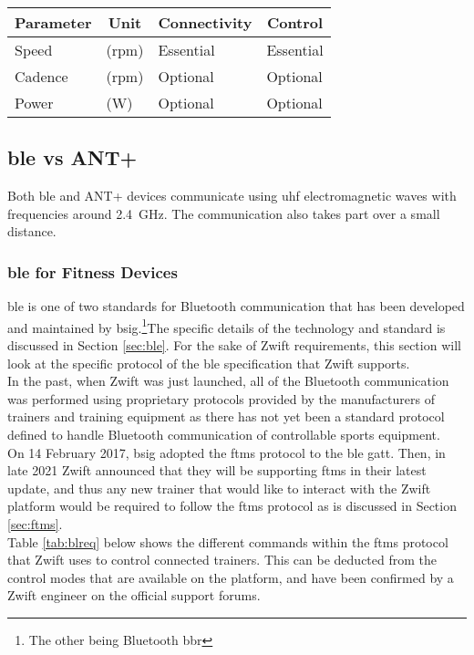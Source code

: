 \begin{table}[h!]
	\renewcommand{\arraystretch}{1.5}
	\centering
	\begin{tabularx}{\textwidth}{ p{2cm} X X X}
		\toprule
		\multicolumn{1}{c}{Parameter} & \multicolumn{1}{c}{Unit} & \multicolumn{1}{c}{Connectivity} & \multicolumn{1}{c}{Control} \\
		\midrule
		Speed                         & (\acs{rpm})              & Essential                        & Essential                   \\
		Cadence                       & (\acs{rpm})              & Optional                         & Optional                    \\
		Power                         & (\si{\watt})             & Optional                         & Optional                    \\
		\bottomrule
	\end{tabularx}
\end{table}

\subsection{\ac{ble} vs ANT+}
Both \ac{ble} and ANT+ devices communicate using \ac{uhf} electromagnetic waves with frequencies around \SI{2.4}{\giga\hertz}. The communication also takes part over a small distance.

\subsubsection{\ac{ble} for Fitness Devices}
\ac{ble} is one of two standards for Bluetooth communication that has been developed and maintained by \ac{bsig}.\footnote{The other being Bluetooth \ac{bbr}}The specific details of the technology and standard is discussed in Section \ref{sec:ble}. For the sake of Zwift requirements, this section will look at the specific protocol of the \ac{ble} specification that Zwift supports.\\
In the past, when Zwift was just launched, all of the Bluetooth communication was performed using proprietary protocols provided by the manufacturers of trainers and training equipment as there has not yet been a standard protocol defined to handle Bluetooth communication of controllable sports equipment. \\
On 14 February 2017, \ac{bsig} adopted the \ac{ftms} protocol to the \ac{ble} \ac{gatt}. Then, in late 2021 Zwift announced that they will be supporting \ac{ftms} in their latest update, and thus any new trainer that would like to interact with the Zwift platform would be required to follow the \ac{ftms} protocol as is discussed in Section \ref{sec:ftms}. \citep{Jeremy:2021}\\
Table \ref{tab:blreq} below shows the different commands within the \ac{ftms} protocol that Zwift uses to control connected trainers. This can be deducted from the control modes that are available on the platform, and have been confirmed by a Zwift engineer on the official support forums.

